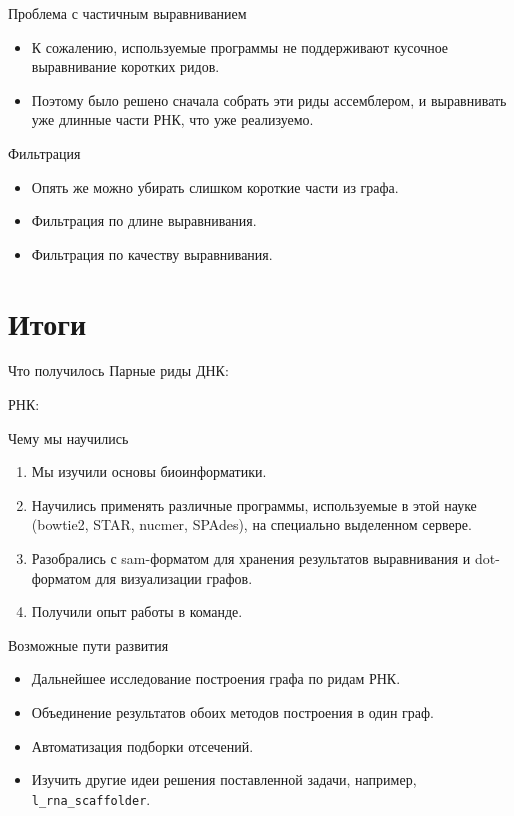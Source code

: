 \documentclass{beamer}
\newcommand{\cimg}[2]{%
	\begin{center}%
		\ifthenelse{\equal{#2}{}}{%
			\texttt{[image: \#1]}
		}{%
			\texttt{[image: \#1]}
		}%
	\end{center}%
}
\begin{document}
\begin{frame}[t]{Проблема с частичным выравниванием}
    \begin{itemize}
    \item
        К сожалению, используемые программы не поддерживают кусочное 
        выравнивание коротких ридов.
    \item
        Поэтому было решено сначала собрать эти риды ассемблером, и выравнивать
        уже длинные части РНК, что уже реализуемо.
    \end{itemize}

    \cimg{4.jpg}{0.6}
\end{frame}

\begin{frame}[t]{Фильтрация}
    \begin{itemize}
    \item
        Опять же можно убирать слишком короткие части из графа.
    \item
        Фильтрация по длине выравнивания.
    \item
        Фильтрация по качеству выравнивания.
    \end{itemize}
\end{frame}

\section{Итоги}
\begin{frame}[t]{Что получилось}
    Парные риды ДНК:
    \cimg{5.jpg}{1}
    РНК:
    \cimg{6.png}{0.5}
\end{frame}

\begin{frame}[t]{Чему мы научились}
    \begin{enumerate}
    \item
        Мы изучили основы биоинформатики.
    \item
        Научились применять различные программы, используемые в этой науке 
        (bowtie2, STAR, nucmer, SPAdes), на специально выделенном сервере.
    \item
        Разобрались с sam-форматом для хранения результатов выравнивания и 
        dot-форматом для визуализации графов.
    \item
        Получили опыт работы в команде.
    \end{enumerate}
\end{frame}

\begin{frame}[t]{Возможные пути развития}
    \begin{itemize}
    \item
        Дальнейшее исследование построения графа по ридам РНК.
    \item
        Объединение результатов обоих методов построения в один граф.
    \item
        Автоматизация подборки отсечений.
    \item
        Изучить другие идеи решения поставленной задачи, например, 
        \texttt{l\_rna\_scaffolder}.
    \end{itemize}
\end{frame}
\end{document}
